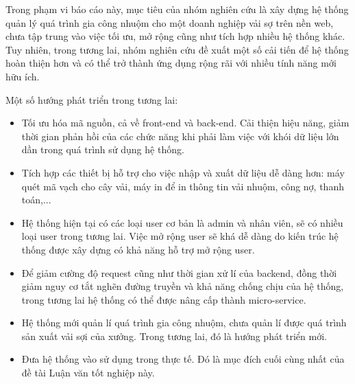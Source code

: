 Trong phạm vi báo cáo này, mục tiêu của nhóm nghiên cứu là xây dựng hệ thống quản lý quá trình gia công nhuộm cho một doanh nghiệp vải sợ trên nền web, chưa tập trung vào việc tối ưu, mở rộng cũng như tích hợp nhiều hệ thống khác. Tuy nhiên, trong tương lai, nhóm nghiên cứu đề xuất một số cải tiến để hệ thống hoàn thiện hơn và có thể trở thành
ứng dụng rộng rãi với nhiều tính năng mới hữu ích.\par

Một số hướng phát triển trong tương lai:
\begin{itemize}
    \item Tối ưu hóa mã nguồn, cả về front-end và back-end. Cải thiện hiệu năng, giảm thời gian phản hồi của các chức năng khi phải làm việc với khói dữ liệu lớn dần trong quá trình sử dụng hệ thống.
    \item Tích hợp các thiết bị hỗ trợ cho việc nhập và xuất dữ liệu dễ dàng hơn: máy quét mã vạch cho cây vải, máy in để in thông tin vải nhuộm, công nợ, thanh toán,...
    \item Hệ thống hiện tại có các loại user cơ bản là admin và nhân viên, sẽ có nhiều loại user trong tương lai. Việc mở rộng user sẽ khá dễ dàng do kiến trúc hệ thống được xây dựng có khả năng hỗ trợ mở rộng user.
    \item Để giảm cường độ request cũng như thời gian xử lí của backend, đồng thời giảm nguy cơ tắt nghẽn đường truyền và khả năng chống chịu của hệ thống, trong tương lai hệ thống có thể được nâng cấp thành micro-service.
    \item Hệ thống mới quản lí quá trình gia công nhuộm, chưa quản lí được quá trình sản xuất vải sợi của xưởng. Trong tương lai, đó là hướng phát triển mới.
    \item Đưa hệ thống vào sử dụng trong thực tế. Đó là mục đích cuối cùng nhất của đề tài Luận văn tốt nghiệp này.
\end{itemize}
